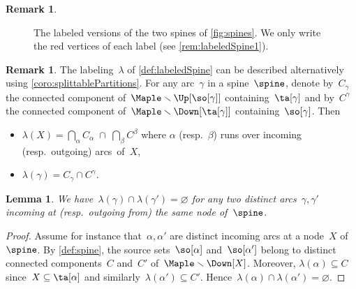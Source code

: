 \documentclass{amsart}
\newtheorem{lemma}[theorem]{Lemma}
\theoremstyle{definition}
\newtheorem{remark}[theorem]{Remark}
\newcommand{\ssm}{\smallsetminus} %
\newcommand{\red}{\color{red}} %
\newcommand{\labeling}{\lambda} %
\begin{document}
\begin{remark}
\begin{figure}[h!]
{
  }
  \caption{The labeled versions of the two spines of \cref{fig:spines}. We only write the red vertices of each label (see \cref{rem:labeledSpine1}).}
  \label{fig:labeledSpines}
\end{figure} 
\end{remark}

\begin{remark}
  \label{rem:labeledSpine2}
  The labeling~$\labeling$ of \cref{def:labeledSpine} can be described alternatively using \cref{coro:splittablePartitions}.
  For any arc~$\gamma$ in a spine~$\spine$, denote by~$C_\gamma$ the connected component of~$\Maple \ssm \Up[{\so[\gamma]}]$ containing~$\ta[\gamma]$ and by~$C^\gamma$ the connected component of~$\Maple \ssm \Down[{\ta[\gamma]}]$ containing~$\so[\gamma]$.
  Then 
  \begin{itemize}
    \item $\labeling(X) = \bigcap_\alpha C_\alpha \; \cap \; \bigcap_\beta C^\beta$ where $\alpha$ (resp.~$\beta$) runs over incoming (resp.~outgoing) arcs~of~$X$,
    \item $\labeling(\gamma) = C_\gamma \cap C^\gamma$.
  \end{itemize}     
\end{remark}

\begin{lemma}
  \label{lem:labeledSpine}
  We have~$\labeling(\gamma) \cap \labeling(\gamma') = \varnothing$ for any two distinct arcs~$\gamma, \gamma'$ incoming at (resp.~outgoing from) the same node of~$\spine$.
\end{lemma}

\begin{proof}
  Assume for instance that~$\alpha, \alpha'$ are distinct incoming arcs at a node~$X$ of~$\spine$.
  By \cref{def:spine}, the source sets~$\so[\alpha]$ and~$\so[\alpha']$ belong to distinct connected components~$C$ and~$C'$ of~$\Maple \ssm \Down[X]$.
  Moreover, $\labeling(\alpha) \subseteq C$ since~$X \subseteq \ta[\alpha]$ and similarly~$\labeling(\alpha') \subseteq C'$.
  Hence~$\labeling(\alpha) \cap \labeling(\alpha') = \varnothing$.
\end{proof}
\end{document}
